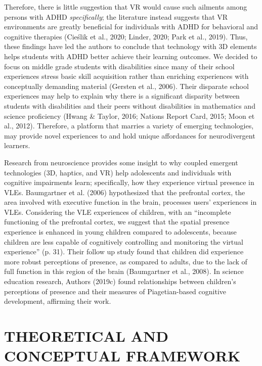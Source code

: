 \documentclass[11.5pt]{sig-alternate} %
\begin{document}
\begin{large}
Therefore, there is little suggestion that VR would cause such ailments among persons with ADHD \textit{specifically}; the literature instead suggests that VR environments are greatly beneficial for individuals with ADHD for behavioral and cognitive therapies (Cieślik et al., 2020; Linder, 2020; Park et al., 2019). Thus, these findings have led the authors to conclude that technology with 3D elements helps students with ADHD better achieve their learning outcomes. We decided to focus on middle grade students with disabilities since many of their school experiences stress basic skill acquisition rather than enriching experiences with conceptually demanding material (Gersten et al., 2006). Their disparate school experiences may help to explain why there is a significant disparity between students with disabilities and their peers without disabilities in mathematics and science proficiency (Hwang \& Taylor, 2016; Nations Report Card, 2015; Moon et al., 2012). Therefore, a platform that marries a variety of emerging technologies, may provide novel experiences to and hold unique affordances for neurodivergent learners. 

Research from neuroscience provides some insight to why coupled emergent technologies (3D, haptics, and VR) help adolescents and individuals with cognitive impairments learn; specifically, how they experience virtual presence in VLEs. Baumgartner et al. (2006) hypothesized that the prefrontal cortex, the area involved with executive function in the brain, processes users’ experiences in VLEs. Considering the VLE experiences of children, with an “incomplete functioning of the prefrontal cortex, we suggest that the spatial presence experience is enhanced in young children compared to adolescents, because children are less capable of cognitively controlling and monitoring the virtual experience” (p. 31). Their follow up study found that children did experience more robust perceptions of presence, as compared to adults, due to the lack of full function in this region of the brain (Baumgartner et al., 2008). In science education research, Authors (2019c) found relationships between children’s perceptions of presence and their measures of Piagetian-based cognitive development, affirming their work.

\section*{THEORETICAL AND CONCEPTUAL FRAMEWORK}


\end{large}
\end{document}
